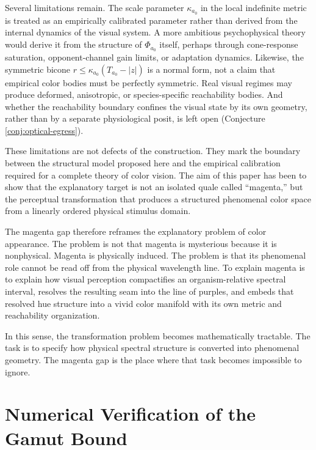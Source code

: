 \documentclass[preprint,12pt,authoryear]{elsarticle}
\theoremstyle{plain}
\theoremstyle{definition}
\theoremstyle{remark}
\begin{document}
Several limitations remain. The scale parameter $\kappa_{a_0}$ in the local indefinite metric is treated as an empirically calibrated parameter rather than derived from the internal dynamics of the visual system. A more ambitious psychophysical theory would derive it from the structure of $\Phi_{a_0}$ itself, perhaps through cone-response saturation, opponent-channel gain limits, or adaptation dynamics. Likewise, the symmetric bicone $r \leq \kappa_{a_0}(T_{a_0}-|z|)$ is a normal form, not a claim that empirical color bodies must be perfectly symmetric. Real visual regimes may produce deformed, anisotropic, or species-specific reachability bodies. And whether the reachability boundary confines the visual state by its own geometry, rather than by a separate physiological posit, is left open (Conjecture \ref{conj:optical-egress}).

These limitations are not defects of the construction. They mark the boundary between the structural model proposed here and the empirical calibration required for a complete theory of color vision. The aim of this paper has been to show that the explanatory target is not an isolated quale called ``magenta,'' but the perceptual transformation that produces a structured phenomenal color space from a linearly ordered physical stimulus domain.

The magenta gap therefore reframes the explanatory problem of color appearance. The problem is not that magenta is mysterious because it is nonphysical. Magenta is physically induced. The problem is that its phenomenal role cannot be read off from the physical wavelength line. To explain magenta is to explain how visual perception compactifies an organism-relative spectral interval, resolves the resulting seam into the line of purples, and embeds that resolved hue structure into a vivid color manifold with its own metric and reachability organization.

In this sense, the transformation problem becomes mathematically tractable. The task is to specify how physical spectral structure is converted into phenomenal geometry. The magenta gap is the place where that task becomes impossible to ignore.

\appendix
\appendix
\section{Numerical Verification of the Gamut Bound}
\label{app:numerics}
\end{document}
